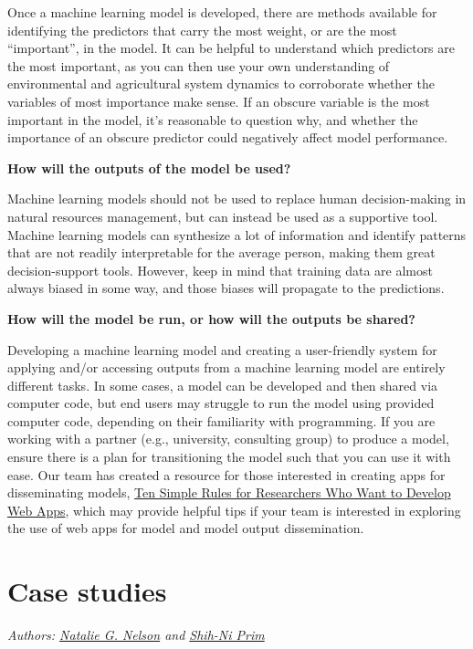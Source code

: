\documentclass[
]{book}
\begin{document}
Once a machine learning model is developed, there are methods available for identifying the predictors that carry the most weight, or are the most ``important'', in the model. It can be helpful to understand which predictors are the most important, as you can then use your own understanding of environmental and agricultural system dynamics to corroborate whether the variables of most importance make sense. If an obscure variable is the most important in the model, it's reasonable to question why, and whether the importance of an obscure predictor could negatively affect model performance.

\textbf{How will the outputs of the model be used?}

Machine learning models should not be used to replace human decision-making in natural resources management, but can instead be used as a supportive tool. Machine learning models can synthesize a lot of information and identify patterns that are not readily interpretable for the average person, making them great decision-support tools. However, keep in mind that training data are almost always biased in some way, and those biases will propagate to the predictions.

\textbf{How will the model be run, or how will the outputs be shared?}

Developing a machine learning model and creating a user-friendly system for applying and/or accessing outputs from a machine learning model are entirely different tasks. In some cases, a model can be developed and then shared via computer code, but end users may struggle to run the model using provided computer code, depending on their familiarity with programming. If you are working with a partner (e.g., university, consulting group) to produce a model, ensure there is a plan for transitioning the model such that you can use it with ease. Our team has created a resource for those interested in creating apps for disseminating models, \href{https://journals.plos.org/ploscompbiol/article?id=10.1371/journal.pcbi.1009663}{Ten Simple Rules for Researchers Who Want to Develop Web Apps}, which may provide helpful tips if your team is interested in exploring the use of web apps for model and model output dissemination.

\hypertarget{case-studies}{%
\chapter{Case studies}\label{case-studies}}

\emph{Authors: \href{https://bae.ncsu.edu/people/nnelson4/}{Natalie G. Nelson} and \href{https://www.linkedin.com/in/shih-ni-prim-14033336/}{Shih-Ni Prim}}
\end{document}
